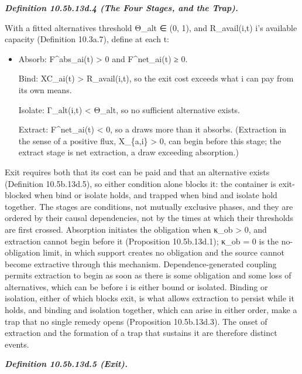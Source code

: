 \documentclass[
]{article}
\providecommand{\tightlist}{%
  \setlength{\itemsep}{0pt}\setlength{\parskip}{0pt}}
\begin{document}
\emph{\textbf{Definition 10.5b.13d.4 (The Four Stages, and the Trap).}}

With a fitted alternatives threshold Θ\_alt ∈ (0, 1), and R\_avail(i,t)
i's available capacity (Definition 10.3a.7), define at each t:

\begin{itemize}
\tightlist
\item
  Absorb: F\^{}abs\_ai(t) \textgreater{} 0 and F\^{}net\_ai(t) ≥ 0.

  Bind: XC\_ai(t) \textgreater{} R\_avail(i,t), so the exit cost exceeds
  what i can pay from its own means.

  Isolate: Γ\_alt(i,t) \textless{} Θ\_alt, so no sufficient alternative
  exists.

  Extract: F\^{}net\_ai(t) \textless{} 0, so a draws more than it
  absorbs. (Extraction in the sense of a positive flux, X\_\{a,i\}
  \textgreater{} 0, can begin before this stage; the extract stage is
  net extraction, a draw exceeding absorption.)
\end{itemize}

Exit requires both that its cost can be paid and that an alternative
exists (Definition 10.5b.13d.5), so either condition alone blocks it:
the container is exit-blocked when bind or isolate holds, and trapped
when bind and isolate hold together. The stages are conditions, not
mutually exclusive phases, and they are ordered by their causal
dependencies, not by the times at which their thresholds are first
crossed. Absorption initiates the obligation when κ\_ob \textgreater{}
0, and extraction cannot begin before it (Proposition 10.5b.13d.1);
κ\_ob = 0 is the no-obligation limit, in which support creates no
obligation and the source cannot become extractive through this
mechanism. Dependence-generated coupling permits extraction to begin as
soon as there is some obligation and some loss of alternatives, which
can be before i is either bound or isolated. Binding or isolation,
either of which blocks exit, is what allows extraction to persist while
it holds, and binding and isolation together, which can arise in either
order, make a trap that no single remedy opens (Proposition
10.5b.13d.3). The onset of extraction and the formation of a trap that
sustains it are therefore distinct events.

\emph{\textbf{Definition 10.5b.13d.5 (Exit).}}
\end{document}

